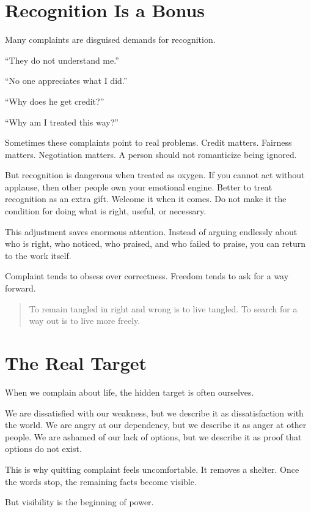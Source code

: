 \section*{Recognition Is a Bonus}

Many complaints are disguised demands for recognition.

``They do not understand me.''

``No one appreciates what I did.''

``Why does he get credit?''

``Why am I treated this way?''

Sometimes these complaints point to real problems. Credit matters. Fairness matters. Negotiation matters. A person should not romanticize being ignored.

But recognition is dangerous when treated as oxygen. If you cannot act without applause, then other people own your emotional engine. Better to treat recognition as an extra gift. Welcome it when it comes. Do not make it the condition for doing what is right, useful, or necessary.

This adjustment saves enormous attention. Instead of arguing endlessly about who is right, who noticed, who praised, and who failed to praise, you can return to the work itself.

Complaint tends to obsess over correctness. Freedom tends to ask for a way forward.

\begin{quote}
To remain tangled in right and wrong is to live tangled. To search for a way out is to live more freely.
\end{quote}

\section*{The Real Target}

When we complain about life, the hidden target is often ourselves.

We are dissatisfied with our weakness, but we describe it as dissatisfaction with the world. We are angry at our dependency, but we describe it as anger at other people. We are ashamed of our lack of options, but we describe it as proof that options do not exist.

This is why quitting complaint feels uncomfortable. It removes a shelter. Once the words stop, the remaining facts become visible.

But visibility is the beginning of power.

